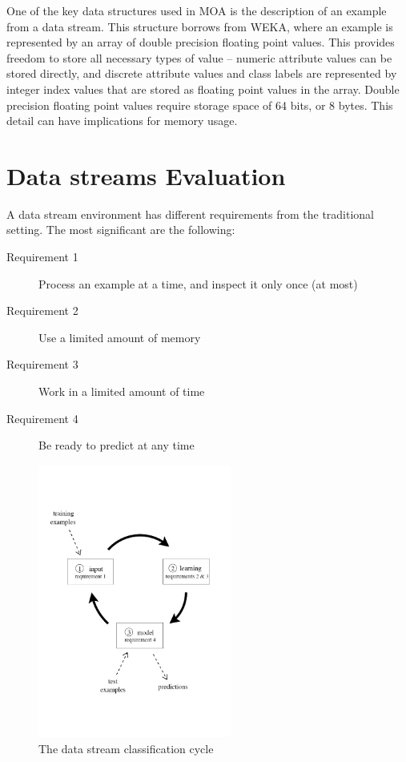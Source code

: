 \documentclass[a4paper,12pt,twoside]{book}
\begin{document}
    One of the key data structures used in MOA is the description of an example
from a data stream. This structure borrows from WEKA, where an example is
represented by an array of double precision floating point values. This provides
freedom to store all necessary types of value \--- numeric attribute values can be
stored directly, and discrete attribute values and class labels are represented
by integer index values that are stored as floating point values in the array.
Double precision floating point values require storage space of 64 bits, or 8
bytes. This detail can have implications for memory usage. %

\section{Data streams Evaluation}
A data stream environment has different requirements from the traditional 
setting. The most significant are the following: 
\begin{description}
\item[Requirement 1] Process an example at a time, and inspect
 it only once (at most)
\item[Requirement 2] Use a limited amount of memory
\item[Requirement 3] Work in a limited amount of time
\item[Requirement 4] Be ready to predict at any time
\end{description}
\begin{figure}[t]
\begin{center} 
\includegraphics[height=9cm]{images/Frame.pdf}
\end{center} 
\caption{The data stream classification cycle}
\label{fig:cycle}
\end{figure} 
\end{document}
